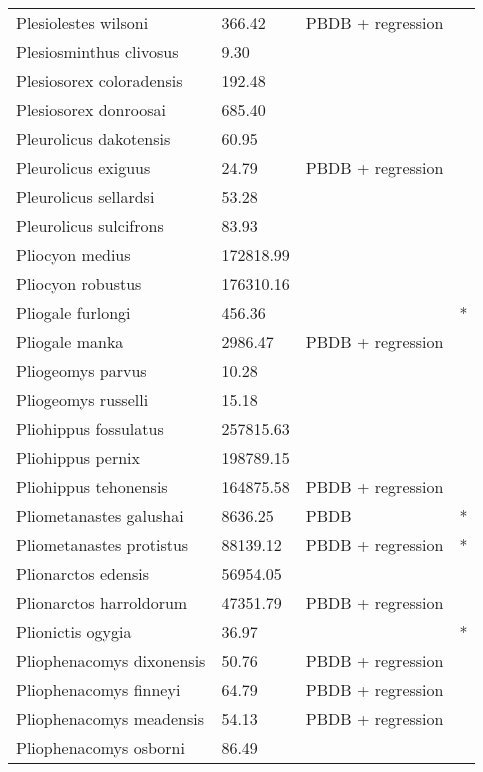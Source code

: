 \documentclass{article}
\begin{document}
\begin{center}
\begin{longtable}{p{} p{} p{} p{}}
    Plesiolestes wilsoni & 366.42 & PBDB + regression &  \\ 
    Plesiosminthus clivosus & 9.30 & \cite{Tomiya2013} &  \\ 
    Plesiosorex coloradensis & 192.48 & \cite{Tomiya2013} &  \\ 
    Plesiosorex donroosai & 685.40 & \cite{Tomiya2013} &  \\ 
    Pleurolicus dakotensis & 60.95 & \cite{Tomiya2013} &  \\ 
    Pleurolicus exiguus & 24.79 & PBDB + regression &  \\ 
    Pleurolicus sellardsi & 53.28 & \cite{Zakrzewski1991a} &  \\ 
    Pleurolicus sulcifrons & 83.93 & \cite{Tomiya2013} &  \\ 
    Pliocyon medius & 172818.99 & \cite{Tomiya2013} &  \\ 
    Pliocyon robustus & 176310.16 & \cite{Tomiya2013} &  \\ 
    Pliogale furlongi & 456.36 & \cite{Wood1962} & * \\ 
    Pliogale manka & 2986.47 & PBDB + regression &  \\ 
    Pliogeomys parvus & 10.28 & \cite{Tomiya2013} &  \\ 
    Pliogeomys russelli & 15.18 & \cite{Tomiya2013} &  \\ 
    Pliohippus fossulatus & 257815.63 & \cite{Tomiya2013} &  \\ 
    Pliohippus pernix & 198789.15 & \cite{Tomiya2013} &  \\ 
    Pliohippus tehonensis & 164875.58 & PBDB + regression &  \\ 
    Pliometanastes galushai & 8636.25 & PBDB & * \\ 
    Pliometanastes protistus & 88139.12 & PBDB + regression & * \\ 
    Plionarctos edensis & 56954.05 & \cite{Tomiya2013} &  \\ 
    Plionarctos harroldorum & 47351.79 & PBDB + regression &  \\ 
    Plionictis ogygia & 36.97 & \cite{Tomiya2013} & * \\ 
    Pliophenacomys dixonensis & 50.76 & PBDB + regression &  \\ 
    Pliophenacomys finneyi & 64.79 & PBDB + regression &  \\ 
    Pliophenacomys meadensis & 54.13 & PBDB + regression &  \\ 
    Pliophenacomys osborni & 86.49 & \cite{Tomiya2013} &  \\ 

\end{longtable}
\end{center}
\end{document}
